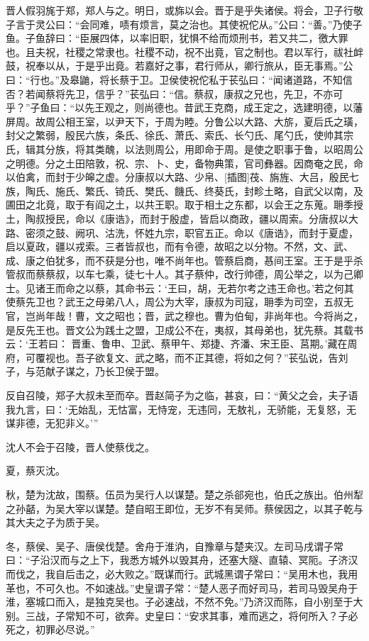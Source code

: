 \documentclass[a4paper,12pt,UTF8,twoside]{ctexbook}
\begin{document}
晋人假羽旄于郑，郑人与之。明日，或旆以会。晋于是乎失诸侯。将会，卫子行敬子言于灵公曰：“会同难，啧有烦言，莫之治也。其使祝佗从。”公曰：“善。”乃使子鱼。子鱼辞曰：“臣展四体，以率旧职，犹惧不给而烦刑书，若又共二，徼大罪也。且夫祝，社稷之常隶也。社稷不动，祝不出竟，官之制也。君以军行，祓社衅鼓，祝奉以从，于是乎出竟。若嘉好之事，君行师从，卿行旅从，臣无事焉。”公曰：“行也。”及皋鼬，将长蔡于卫。卫侯使祝佗私于苌弘曰：“闻诸道路，不知信否？若闻蔡将先卫，信乎？”苌弘曰：“信。蔡叔，康叔之兄也，先卫，不亦可乎？”子鱼曰：“以先王观之，则尚德也。昔武王克商，成王定之，选建明德，以藩屏周。故周公相王室，以尹天下，于周为睦。分鲁公以大路、大旂，夏后氏之璜，封父之繁弱，殷民六族，条氏、徐氏、萧氏、索氏、长勺氏、尾勺氏，使帅其宗氏，辑其分族，将其类醜，以法则周公，用即命于周。是使之职事于鲁，以昭周公之明德。分之土田陪敦，祝、宗、卜、史，备物典策，官司彝器。因商奄之民，命以伯禽，而封于少皞之虚。分康叔以大路、少帛、[插图]茷、旃旌、大吕，殷民七族，陶氏、施氏、繁氏、锜氏、樊氏、饑氏、终葵氏，封畛土略，自武父以南，及圃田之北竟，取于有阎之土，以共王职。取于相土之东都，以会王之东蒐。耼季授土，陶叔授民，命以《康诰》，而封于殷虚，皆启以商政，疆以周索。分唐叔以大路、密须之鼓、阙巩、沽洗，怀姓九宗，职官五正。命以《唐诰》，而封于夏虚，启以夏政，疆以戎索。三者皆叔也，而有令德，故昭之以分物。不然，文、武、成、康之伯犹多，而不获是分也，唯不尚年也。管蔡启商，惎间王室。王于是乎杀管叔而蔡蔡叔，以车七乘，徒七十人。其子蔡仲，改行帅德，周公举之，以为己卿士。见诸王而命之以蔡，其命书云：‘王曰，胡，无若尔考之违王命也。’若之何其使蔡先卫也？武王之母弟八人，周公为大宰，康叔为司寇，耼季为司空，五叔无官，岂尚年哉！曹，文之昭也；晋，武之穆也。曹为伯甸，非尚年也。今将尚之，是反先王也。晋文公为践土之盟，卫成公不在，夷叔，其母弟也，犹先蔡。其载书云：‘王若曰： 晋重、鲁申、卫武、蔡甲午、郑捷、齐潘、宋王臣、莒期。’藏在周府，可覆视也。吾子欲复文、武之略，而不正其德，将如之何？”苌弘说，告刘子，与范献子谋之，乃长卫侯于盟。

反自召陵，郑子大叔未至而卒。晋赵简子为之临，甚哀，曰：“黄父之会，夫子语我九言，曰：‘无始乱，无怙富，无恃宠，无违同，无敖礼，无骄能，无复怒，无谋非德，无犯非义。’”

沈人不会于召陵，晋人使蔡伐之。

夏，蔡灭沈。

秋，楚为沈故，围蔡。伍员为吴行人以谋楚。楚之杀郤宛也，伯氏之族出。伯州犁之孙嚭，为吴大宰以谋楚。楚自昭王即位，无岁不有吴师。蔡侯因之，以其子乾与其大夫之子为质于吴。

冬，蔡侯、吴子、唐侯伐楚。舍舟于淮汭，自豫章与楚夹汉。左司马戌谓子常曰：“子沿汉而与之上下，我悉方城外以毁其舟，还塞大隧、直辕、冥阨。子济汉而伐之，我自后击之，必大败之。”既谋而行。武城黑谓子常曰：“吴用木也，我用革也，不可久也。不如速战。”史皇谓子常：“楚人恶子而好司马，若司马毁吴舟于淮，塞城口而入，是独克吴也。子必速战，不然不免。”乃济汉而陈，自小别至于大别。三战，子常知不可，欲奔。史皇曰：“安求其事，难而逃之，将何所入？子必死之，初罪必尽说。”
\end{document}
